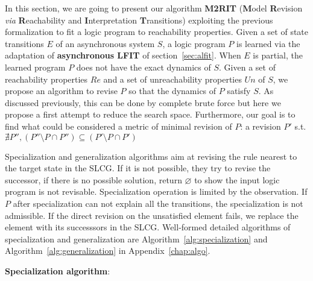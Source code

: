     In this section, we are going to present our algorithm \textbf{M2RIT} (\textbf{M}odel \textbf{R}evision \textit{via} \textbf{R}eachability and \textbf{I}nterpretation \textbf{T}ransitions) exploiting the previous formalization to fit a logic program to reachability properties.
    Given a set of state transitions $E$ of an asynchronous system $S$, a logic program $P$ is learned via the adaptation of \textbf{asynchronous LFIT} of section~\ref{sec:alfit}.
    When $E$ is partial, the learned program $P$ does not have the exact dynamics of $S$.
    Given a set of reachability properties $Re$ and a set of unreachability properties $Un$ of $S$, we propose an algorithm to revise $P$ so that the dynamics of $P$ satisfy $S$.
    As discussed previously, this can be done by complete brute force but here we propose a first attempt to reduce the search space.
    Furthermore, our goal is to find what could be considered a metric of minimal revision of $P$:
    a revision $P'$ s.t. $\nexists P'', (P''\setminus P \cap P'')\subseteq (P' \setminus P \cap P')$
   
    Specialization and generalization algorithms aim at revising the rule nearest to the target state in the SLCG. 
    If it is not possible, they try to revise the successor, if there is no possible solution, return $\varnothing$ to show the input logic program is not revisable.
    Specialization operation is limited by the observation. If $P$ after specialization can not explain all the transitions, the specialization is not admissible.
    If the direct revision on the unsatisfied element fails, we replace the element with its successsors in the SLCG.
    Well-formed detailed algorithms of specialization and generalization are Algorithm~\ref{alg:specialization} and Algorithm~\ref{alg:generalization} in Appendix~\ref{chap:algo}.
   
    
    \textbf{Specialization algorithm}:
    
